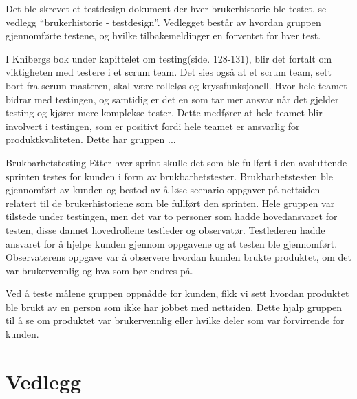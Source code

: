 \documentclass[12pt,a4paper,norsk]{article}
\begin{document}
Det ble skrevet et testdesign dokument der hver brukerhistorie ble testet, se vedlegg “brukerhistorie - testdesign”. Vedlegget består av hvordan gruppen gjennomførte testene, og hvilke tilbakemeldinger en forventet for hver test.

I Knibergs bok under kapittelet om testing(side. 128-131), blir det fortalt om viktigheten med testere i et scrum team. Det sies også at et scrum team, sett bort fra scrum-masteren, skal være rolleløs og kryssfunksjonell. Hvor hele teamet bidrar med testingen, og samtidig er det en som tar mer ansvar når det gjelder testing og kjører mere komplekse tester. Dette medfører at hele teamet blir involvert i testingen, som er positivt fordi hele teamet er ansvarlig for produktkvaliteten.
Dette har gruppen ...

Brukbarhetstesting
Etter hver sprint skulle det som ble fullført i den avsluttende sprinten testes for kunden i form av brukbarhetstester. Brukbarhetstesten ble gjennomført av kunden og bestod av å løse scenario oppgaver på nettsiden relatert til de brukerhistoriene som ble fullført den sprinten. Hele gruppen var tilstede under testingen, men det var to personer som hadde hovedansvaret for testen, disse dannet hovedrollene testleder og observatør. Testlederen hadde ansvaret for å hjelpe kunden gjennom oppgavene og at testen ble gjennomført. Observatørens oppgave var å observere hvordan kunden brukte produktet, om det var brukervennlig og hva som bør endres på.

Ved å teste målene gruppen oppnådde for kunden, fikk vi sett hvordan produktet ble brukt av en person som ikke har jobbet med nettsiden. Dette hjalp gruppen til å se om produktet var brukervennlig eller hvilke deler som var forvirrende for kunden. 

\newpage
{}
{}


\section{Vedlegg}

%



%
%
%
\end{document}
